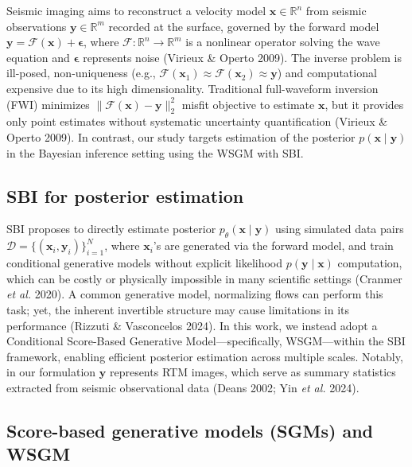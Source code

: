 \documentclass{IMAGE2025}
\begin{document}
Seismic imaging aims to reconstruct a velocity model
\(\mathbf{x} \in \mathbb{R}^n\) from seismic observations
\(\mathbf{y} \in \mathbb{R}^m\) recorded at the surface, governed by the
forward model
\(\mathbf{y} = \mathbf{\mathcal{F}}(\mathbf{x}) + \boldsymbol{\epsilon}\),
where \(\mathbf{\mathcal{F}}: \mathbb{R}^n \rightarrow \mathbb{R}^m\) is
a nonlinear operator solving the wave equation and
\(\boldsymbol{\epsilon}\) represents noise (Virieux \& Operto 2009). The
inverse problem is ill-posed, non-uniqueness (e.g.,
\(\mathbf{\mathcal{F}}(\mathbf{x}_1) \approx \mathbf{\mathcal{F}}(\mathbf{x}_2) \approx \mathbf{y}\))
and computational expensive due to its high dimensionality. Traditional
full-waveform inversion (FWI) minimizes
\(\|\mathbf{\mathcal{F}}(\mathbf{x}) - \mathbf{y}\|_2^2\) misfit
objective to estimate \(\mathbf{x}\), but it provides only point
estimates without systematic uncertainty quantification (Virieux \&
Operto 2009). In contrast, our study targets estimation of the posterior
\(p(\mathbf{x} \mid \mathbf{y})\) in the Bayesian inference setting
using the WSGM with SBI.

\subsection{SBI for posterior
estimation}\label{sbi-for-posterior-estimation}

SBI proposes to directly estimate posterior
\(p_{\theta}(\mathbf{x} \mid \mathbf{y})\) using simulated data pairs
\(\mathcal{D} = \{ (\mathbf{x}_i, \mathbf{y}_i) \}_{i=1}^{N}\), where
\(\mathbf{x}_i\)'s are generated via the forward model, and train
conditional generative models without explicit likelihood
\(p(\mathbf{y} \mid \mathbf{x})\) computation, which can be costly or
physically impossible in many scientific settings (Cranmer \emph{et al.}
2020). A common generative model, normalizing flows can perform this
task; yet, the inherent invertible structure may cause limitations in
its performance (Rizzuti \& Vasconcelos 2024). In this work, we instead
adopt a Conditional Score-Based Generative Model---specifically,
WSGM---within the SBI framework, enabling efficient posterior estimation
across multiple scales. Notably, in our formulation \(\mathbf{y}\)
represents RTM images, which serve as summary statistics extracted from
seismic observational data (Deans 2002; Yin \emph{et al.} 2024).

\subsection{Score-based generative models (SGMs) and
WSGM}\label{score-based-generative-models-sgms-and-wsgm}
\end{document}
